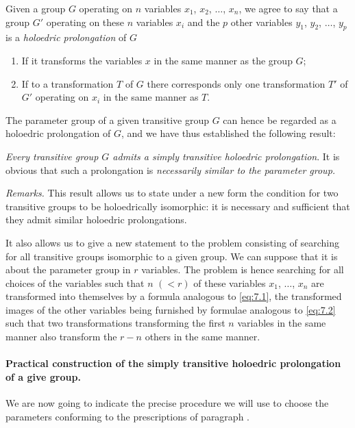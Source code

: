 Given a group $G$ operating on $n$ variables $x_{1}$, $x_{2}$, $\dots$, $x_{n}$, we agree to say that a group $G'$ operating on these $n$ variables $x_{i}$ and the $p$ other variables $y_{1}$, $y_{2}$, $\dots$, $y_{p}$ is a \emph{holoedric prolongation} of $G$
\begin{enumerate}
\item If it transforms the variables $x$ in the same manner as the group $G$;
\item If to a transformation $T$ of $G$ there corresponds only one transformation $T'$ of $G'$ operating on $x_{i}$ in the same manner as $T$.
\end{enumerate}

The parameter group of a given transitive group $G$ can hence be regarded as a holoedric prolongation of $G$, and we have thus established the following result:

\somespace

\emph{Every transitive group $G$ admits a simply transitive holoedric prolongation}. It is obvious that such a prolongation is \emph{necessarily similar to the parameter group.}

\somespace

\emph{Remarks.} This result allows us to state under a new form the condition for two transitive groups to be holoedrically isomorphic: it is necessary and sufficient that they admit similar holoedric prolongations.

It also allows us to give a new statement to the problem consisting of searching for all transitive groups isomorphic to a given group. We can suppose that it is about the parameter group in $r$ variables. The problem is hence searching for all choices of the variables such that $n$ $(<r)$ of these variables $x_{1}$, $\dots$, $x_{n}$ are transformed into themselves by a formula analogous to \eqref{eq:7.1}, the transformed images of the other variables being furnished by formulae analogous to \eqref{eq:7.2} such that two transformations transforming the first $n$ variables in the same manner also transform the $r-n$ others in the same manner.


\paragraph{Practical construction of the simply transitive holoedric prolongation of a give group.}
\label{sec:101}
We are now going to indicate the precise procedure we will use to choose the parameters conforming to the prescriptions of paragraph .


